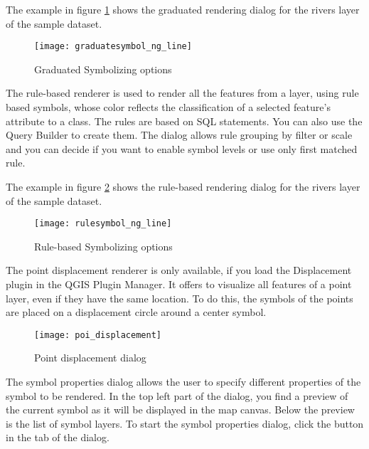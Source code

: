 The example in figure \ref{fig:gradsymNG} shows the graduated rendering dialog
for the rivers layer of the \qg sample dataset.

\begin{figure}[ht]
   \centering
   \texttt{[image: graduatesymbol\_ng\_line]}
   \caption{Graduated Symbolizing options \nixcaption}\label{fig:gradsymNG}
\end{figure}


The rule-based renderer is used to render all the features from a layer, using
rule based symbols, whose color reflects the classification of a selected
feature's attribute to a class. The rules are based on SQL statements. You can 
also use the Query Builder to create them. The dialog allows rule grouping by 
filter or scale and you can decide if you want to enable symbol levels or use 
only first matched rule.

The example in figure \ref{fig:rulesymNG} shows the rule-based rendering dialog
for the rivers layer of the \qg sample dataset.

\begin{figure}[ht]
   \centering
   \texttt{[image: rulesymbol\_ng\_line]}
   \caption{Rule-based Symbolizing options \nixcaption}\label{fig:rulesymNG}
\end{figure}


The point displacement renderer is only available, if you load the Displacement 
plugin in the QGIS Plugin Manager. It offers to visualize all features of a point
layer, even if they have the same location. To do this, the symbols of the
points are placed on a displacement circle around a center symbol.

\begin{figure}[ht]
   \centering
   \texttt{[image: poi\_displacement]}
   \caption{Point displacement dialog \nixcaption}\label{fig:poidissymNG}
\end{figure}


The symbol properties dialog allows the user to specify different properties of
the symbol to be rendered. In the top left part of the dialog, you find a preview
of the current symbol as it will be displayed in the map canvas. Below the preview
is the list of symbol layers. To start the symbol properties dialog, click the
 button in the  tab of the
 dialog.

